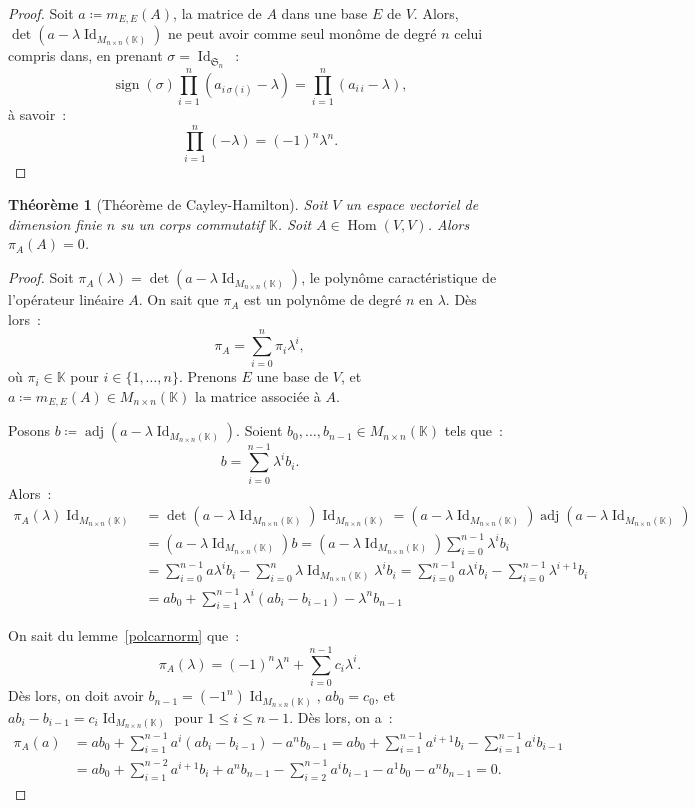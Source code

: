 \documentclass{article}
\DeclareMathOperator{\Id}{Id}
\DeclareMathOperator{\sign}{sign}
\DeclareMathOperator{\Hom}{Hom}
\DeclareMathOperator{\adj}{adj}
\newcommand{\K}{\mathbb K}
\newcommand{\M}[3]{M_{#1 \times #2}(#3)}
\newcommand{\Perm}{\mathfrak{S}}
\newtheorem{thm}{Théorème}[section]
\theoremstyle{definition}
\theoremstyle{remark}
\begin{document}
		\begin{proof} Soit $a \coloneqq m_{E, E}(A)$, la matrice de $A$ dans une base $E$ de $V$. Alors, $\det(a - \lambda\Id_{\M nn\K})$ ne peut avoir comme seul
		monôme de degré $n$ celui compris dans, en prenant $\sigma = \Id_{\Perm_n}$~:
		\[\sign(\sigma)\prod_{i=1}^n(a_{i\,\sigma(i)} - \lambda) = \prod_{i=1}^n(a_{i\,i} - \lambda),\]
		à savoir~: \[\prod_{i=1}^n(-\lambda) = (-1)^n\lambda^n.\] \end{proof}

		\begin{thm}[Théorème de Cayley-Hamilton]\label{Cayley-Hamilton} Soit $V$ un espace vectoriel de dimension finie $n$ su un corps commutatif $\K$. Soit
		$A \in \Hom(V, V)$. Alors $\pi_A(A) = 0$. \end{thm}

		\begin{proof} Soit $\pi_A(\lambda) = \det(a - \lambda\Id_{\M nn\K})$, le polynôme caractéristique de l'opérateur linéaire $A$. On sait que $\pi_A$ est un
		polynôme de degré $n$ en $\lambda$. Dès lors~:
		\[\pi_A = \sum_{i=0}^n\pi_i\lambda^i,\]
		où $\pi_i \in \K$ pour $i \in \{1, \dotsc, n\}$. Prenons $E$ une base de $V$, et $a \coloneqq m_{E, E}(A) \in \M nn\K$ la matrice associée à $A$.

		Posons $b \coloneqq \adj(a - \lambda\Id_{\M nn\K})$. Soient $b_0, \dotsc, b_{n-1} \in \M nn\K$ tels que~: \[b = \sum_{i=0}^{n-1}\lambda^ib_i.\]
		Alors~:
		\[\begin{aligned}
			\pi_A(\lambda)\Id_{\M nn\K} &= \det(a - \lambda\Id_{\M nn\K})\Id_{\M nn\K} = (a - \lambda\Id_{\M nn\K})\adj(a - \lambda\Id_{\M nn\K}) \\
			                            &= (a - \lambda\Id_{\M nn\K})b = (a - \lambda\Id_{\M nn\K})\sum_{i=0}^{n-1}\lambda^ib_i \\
			                            &= \sum_{i=0}^{n-1}a\lambda^ib_i - \sum_{i=0}^n\lambda\Id_{\M nn\K}\lambda^ib_i
			                            = \sum_{i=0}^{n-1}a\lambda^ib_i - \sum_{i=0}^{n-1}\lambda^{i+1}b_i \\
										&= ab_0 + \sum_{i=1}^{n-1}\lambda^i(ab_i - b_{i-1}) - \lambda^nb_{n-1}
		\end{aligned}\]

		On sait du lemme~\ref{polcarnorm} que~: \[\pi_A(\lambda) = (-1)^n\lambda^n + \sum_{i=0}^{n-1}c_i\lambda^i.\]
		Dès lors, on doit avoir $b_{n-1} = (-1^n)\Id_{\M nn\K}$, $ab_0 = c_0$, et $ab_i - b_{i-1} = c_i\Id_{\M nn\K}$ pour $1 \leq i \leq n-1$. Dès lors, on a~:
		\[\begin{aligned}
			\pi_A(a) &= ab_0 + \sum_{i=1}^{n-1}a^i(ab_i-b_{i-1}) - a^nb_{b-1} = ab_0 + \sum_{i=1}^{n-1}a^{i+1}b_i - \sum_{i=1}^{n-1}a^ib_{i-1} \\
			         &= ab_0 + \sum_{i=1}^{n-2}a^{i+1}b_i + a^{n}b_{n-1} - \sum_{i=2}^{n-1}a^ib_{i-1} - a^1b_0 - a^nb_{n-1} = 0.
		\end{aligned}\]
		\end{proof}
	
\end{document}

